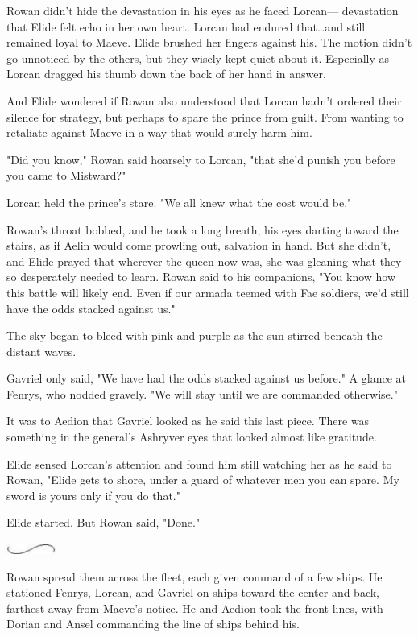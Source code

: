 Rowan didn't hide the devastation in his eyes as he faced Lorcan--- devastation that Elide felt echo in her own heart.
Lorcan had endured that\ldots and still remained loyal to Maeve.
Elide brushed her fingers against his.
The motion didn't go unnoticed by the others, but they wisely kept quiet about it.
Especially as Lorcan dragged his thumb down the back of her hand in answer.

And Elide wondered if Rowan also understood that Lorcan hadn't ordered their silence for strategy, but perhaps to spare the prince from guilt.
From wanting to retaliate against Maeve in a way that would surely harm him.

"Did you know," Rowan said hoarsely to Lorcan, "that she'd punish you before you came to Mistward?"

Lorcan held the prince's stare.
"We all knew what the cost would be."

Rowan's throat bobbed, and he took a long breath, his eyes darting toward the stairs, as if Aelin would come prowling out, salvation in hand.
But she didn't, and Elide prayed that wherever the queen now was, she was gleaning what they so desperately needed to learn.
Rowan said to his companions, "You know how this battle will likely end.
Even if our armada teemed with Fae soldiers, we'd still have the odds stacked against us."

The sky began to bleed with pink and purple as the sun stirred beneath the distant waves.

Gavriel only said, "We have had the odds stacked against us before."
A glance at Fenrys, who nodded gravely.
"We will stay until we are commanded otherwise."

It was to Aedion that Gavriel looked as he said this last piece.
There was something in the general's Ashryver eyes that looked almost like gratitude.

Elide sensed Lorcan's attention and found him still watching her as he said to Rowan, "Elide gets to shore, under a guard of whatever men you can spare.
My sword is yours only if you do that."

Elide started.
But Rowan said, "Done."

\begin{center}
	\includegraphics[width=0.65in,height=0.13in]{images/seperator}
\end{center}

Rowan spread them across the fleet, each given command of a few ships.
He stationed Fenrys, Lorcan, and Gavriel on ships toward the center and back, farthest away from Maeve's notice.
He and Aedion took the front lines, with Dorian and Ansel commanding the line of ships behind his.

